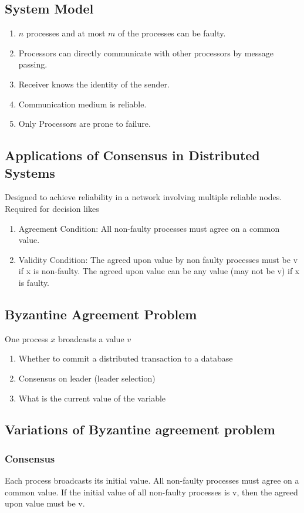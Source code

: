 \documentclass[twoside]{article}
\begin{document}
\subsection{System Model}
\begin{enumerate}
\item $n$ processes and at most $m$ of the processes can be faulty.
\item Processors can directly communicate with other processors by message passing.
\item Receiver knows the identity of the sender.
\item Communication medium is reliable.
\item Only Processors are prone to failure.
\end{enumerate}

\subsection{Applications of Consensus in Distributed Systems}
Designed to achieve reliability in a network involving multiple reliable nodes.
Required for decision likes
\begin{enumerate}
\item Agreement Condition: All non-faulty processes must agree on a common value.
\item Validity Condition: The agreed upon value by non faulty processes must be v if x is non-faulty. The agreed upon value can be any value (may not be v) if x is faulty.
\end{enumerate}

\subsection{Byzantine Agreement Problem}
One process $x$ broadcasts a value $v$
\begin{enumerate}
\item Whether to commit a distributed transaction to a database
\item Consensus on leader (leader selection)
\item What is the current value of the variable
\end{enumerate}

\subsection{Variations of Byzantine agreement problem}
\subsubsection{Consensus}
Each process broadcasts its initial value. All non-faulty processes must agree on a common value. If the initial value of all non-faulty processes is v, then the agreed upon value must be v.
\end{document}
